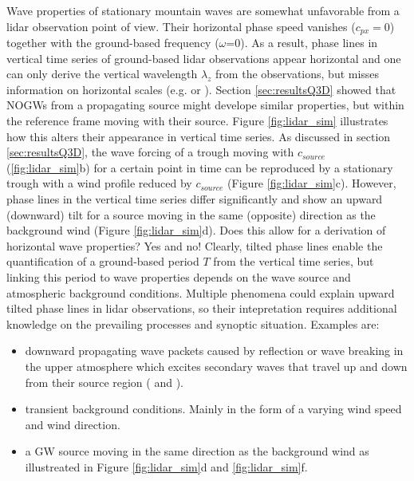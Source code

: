 Wave properties of stationary mountain waves are somewhat unfavorable from a lidar observation point of view. Their horizontal phase speed vanishes ($c_{px}=0$) together with the ground-based frequency ($\omega$=0). As a result, phase lines in vertical time series of ground-based lidar observations appear horizontal and one can only derive the vertical wavelength $\lambda_z$ from the observations, but misses information on horizontal scales (e.g. \cite[]{dornbrack_interpretation_2017} or \cite[]{reichert_highcadence_2021}). Section \ref{sec:resultsQ3D} showed that NOGWs from a propagating source might develope similar properties, but within the reference frame moving with their source. Figure \ref{fig:lidar_sim} illustrates how this alters their appearance in vertical time series. As discussed in section \ref{sec:resultsQ3D}, the wave forcing of a trough moving with $c_{source}$ (\ref{fig:lidar_sim}b) for a certain point in time can be reproduced by a stationary trough with a wind profile reduced by $c_{source}$ (Figure \ref{fig:lidar_sim}c). However, phase lines in the vertical time series differ significantly and show an upward (downward) tilt for a source moving in the same (opposite) direction as the background wind (Figure \ref{fig:lidar_sim}d). Does this allow for a derivation of horizontal wave properties? Yes and no! Clearly, tilted phase lines enable the quantification of a ground-based period $T$ from the vertical time series, but linking this period to wave properties depends on the wave source and atmospheric background conditions. Multiple phenomena could explain upward tilted phase lines in lidar observations, so their intepretation requires additional knowledge on the prevailing processes and synoptic situation. Examples are:

\begin{itemize}
    \item downward propagating wave packets caused by reflection or wave breaking in the upper atmosphere which excites secondary waves that travel up and down from their source region (\cite[]{dornbrack_interpretation_2017} and \cite[]{vadas_mechanism_2003}).

    \item transient background conditions. Mainly in the form of a varying wind speed and wind direction.

    \item a GW source moving in the same direction as the background wind as illustreated in Figure \ref{fig:lidar_sim}d and \ref{fig:lidar_sim}f.
\end{itemize}

